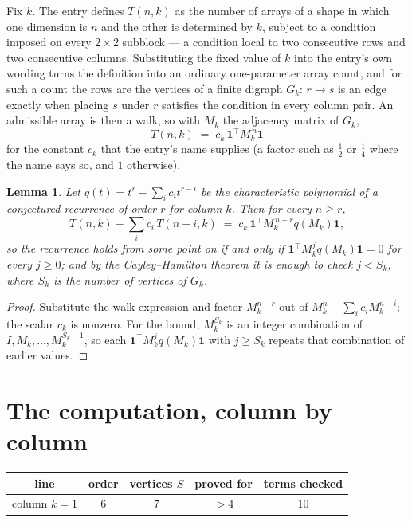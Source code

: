 \documentclass[11pt,a4paper]{article}
\theoremstyle{plain}
\newtheorem{lemma}[theorem]{Lemma}
\theoremstyle{definition}
\begin{document}
Fix $k$. The entry defines $T(n,k)$ as the number of arrays of a shape in which one dimension
is $n$ and the other is determined by $k$, subject to a condition imposed on every
$2\times2$ subblock --- a condition local to two consecutive rows and two consecutive columns.
Substituting the fixed value of $k$ into the entry's own wording turns the definition into an
ordinary one-parameter array count, and for such a count the rows are the vertices of a finite
digraph $G_k$: $r\to s$ is an edge exactly when placing $s$ under $r$ satisfies the condition
in every column pair. An admissible array is then a walk, so with $M_k$ the adjacency matrix
of $G_k$,
\[
T(n,k)\;=\;c_k\,\mathbf{1}^{\!\top}M_k^{\,n}\mathbf{1}
\]
for the constant $c_k$ that the entry's name supplies (a factor such as $\tfrac12$ or
$\tfrac14$ where the name says so, and $1$ otherwise).

\begin{lemma}\label{lem:crit}
Let $q(t)=t^{r}-\sum_i c_it^{r-i}$ be the characteristic polynomial of a conjectured
recurrence of order $r$ for column $k$. Then for every $n\ge r$,
\[
T(n,k)-\sum_i c_i\,T(n-i,k)\;=\;c_k\,\mathbf{1}^{\!\top}M_k^{\,n-r}q(M_k)\mathbf{1},
\]
so the recurrence holds from some point on if and only if
$\mathbf{1}^{\!\top}M_k^{j}q(M_k)\mathbf{1}=0$ for every $j\ge0$; and by the
Cayley--Hamilton theorem it is enough to check $j<S_k$, where $S_k$ is the number of vertices
of $G_k$.
\end{lemma}

\begin{proof}
Substitute the walk expression and factor $M_k^{n-r}$ out of $M_k^{n}-\sum_ic_iM_k^{n-i}$;
the scalar $c_k$ is nonzero. For the bound, $M_k^{S_k}$ is an integer combination of
$I,M_k,\dots,M_k^{S_k-1}$, so each $\mathbf{1}^{\!\top}M_k^{j}q(M_k)\mathbf{1}$ with
$j\ge S_k$ repeats that combination of earlier values.
\end{proof}

\section{The computation, column by column}

\begin{center}
\begin{tabular}{ccccc}
line & order & vertices $S$ & proved for & terms checked \\ \hline
column $k$$=1$ & $6$ & $7$ & $>4$ & $10$ \\
\end{tabular}
\end{center}
\end{document}
